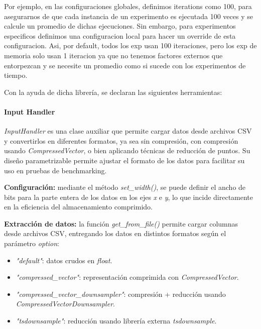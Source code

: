 Por ejemplo, en las configuraciones globales, definimos iterations como 100, para asegurarnos de que cada instancia de un experimento es ejecutada 100 veces y se calcule un promedio de dichas ejecuciones. Sin embargo, para experimentos especificos definimos una configuracion local para hacer un override de esta configuracion. Asi, por default, todos los exp usan 100 iteraciones, pero los exp de memoria solo usan 1 iteracion ya que no tenemos factores externos que entorpezcan y se necesite un promedio como si sucede con los experimentos de tiempo.

Con la ayuda de dicha librería, se declaran las siguientes herramientas:

\paragraph{Input Handler}
\vspace{0.5em}
\textit{InputHandler} es una clase auxiliar que permite cargar datos desde archivos CSV y convertirlos en diferentes formatos, ya sea sin compresión, con compresión usando \textit{CompressedVector}, o bien aplicando técnicas de reducción de puntos. Su diseño parametrizable permite ajustar el formato de los datos para facilitar su uso en pruebas de benchmarking.

\vspace{0.5em}
\textbf{Configuración:} mediante el método \textit{set\_width()}, se puede definir el ancho de bits para la parte entera de los datos en los ejes \textit{x} e \textit{y}, lo que incide directamente en la eficiencia del almacenamiento comprimido.

\vspace{0.5em}
\textbf{Extracción de datos:} la función \textit{get\_from\_file()} permite cargar columnas desde archivos CSV, entregando los datos en distintos formatos según el parámetro \textit{option}:
\begin{itemize}
    \item \textit{"default"}: datos crudos en \textit{float}.
    \item \textit{"compressed\_vector"}: representación comprimida con \textit{CompressedVector}.
    \item \textit{"compressed\_vector\_downsampler"}: compresión + reducción usando \textit{CompressedVectorDownsampler}.
    \item \textit{"tsdownsample"}: reducción usando librería externa \textit{tsdownsample}.
\end{itemize}

